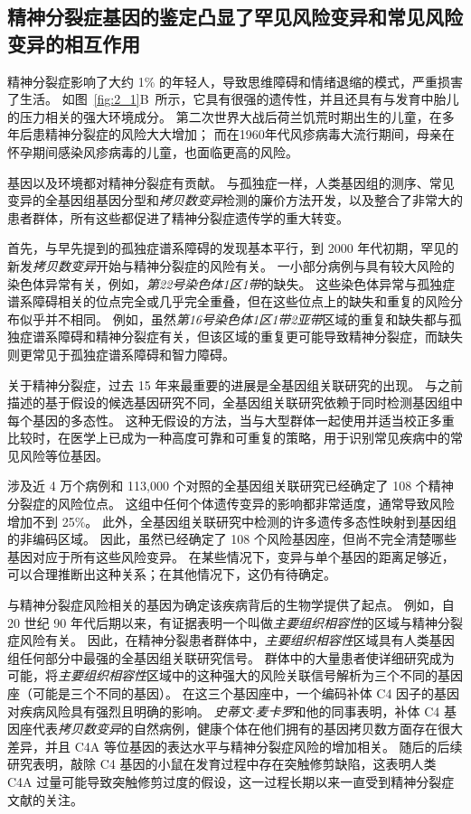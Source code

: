 \subsection{精神分裂症基因的鉴定凸显了罕见风险变异和常见风险变异的相互作用}

精神分裂症影响了大约 1\% 的年轻人，导致思维障碍和情绪退缩的模式，严重损害了生活。
如图~\ref{fig:2_1}B~所示，它具有很强的遗传性，并且还具有与发育中胎儿的压力相关的强大环境成分。
第二次世界大战后荷兰饥荒时期出生的儿童，在多年后患精神分裂症的风险大大增加；
而在1960年代风疹病毒大流行期间，母亲在怀孕期间感染风疹病毒的儿童，也面临更高的风险。

基因以及环境都对精神分裂症有贡献。
与孤独症一样，人类基因组的测序、常见变异的全基因组基因分型和\textit{拷贝数变异}检测的廉价方法开发，以及整合了非常大的患者群体，所有这些都促进了精神分裂症遗传学的重大转变。

首先，与早先提到的孤独症谱系障碍的发现基本平行，到 2000 年代初期，罕见的新发\textit{拷贝数变异}开始与精神分裂症的风险有关。
一小部分病例与具有较大风险的染色体异常有关，例如，\textit{第22号染色体1区1带}的缺失。
这些染色体异常与孤独症谱系障碍相关的位点完全或几乎完全重叠，但在这些位点上的缺失和重复的风险分布似乎并不相同。
例如，虽然\textit{第16号染色体1区1带2亚带}区域的重复和缺失都与孤独症谱系障碍和精神分裂症有关，但该区域的重复更可能导致精神分裂症，而缺失则更常见于孤独症谱系障碍和智力障碍。


关于精神分裂症，过去 15 年来最重要的进展是全基因组关联研究的出现。
与之前描述的基于假设的候选基因研究不同，全基因组关联研究依赖于同时检测基因组中每个基因的多态性。
这种无假设的方法，当与大型群体一起使用并适当校正多重比较时，在医学上已成为一种高度可靠和可重复的策略，用于识别常见疾病中的常见风险等位基因。


涉及近 4 万个病例和 113,000 个对照的全基因组关联研究已经确定了 108 个精神分裂症的风险位点。 
这组中任何个体遗传变异的影响都非常适度，通常导致风险增加不到 25\%。
此外，全基因组关联研究中检测的许多遗传多态性映射到基因组的非编码区域。
因此，虽然已经确定了 108 个风险基因座，但尚不完全清楚哪些基因对应于所有这些风险变异。
在某些情况下，变异与单个基因的距离足够近，可以合理推断出这种关系；在其他情况下，这仍有待确定。


与精神分裂症风险相关的基因为确定该疾病背后的生物学提供了起点。
例如，自 20 世纪 90 年代后期以来，有证据表明一个叫做\textit{主要组织相容性}的区域与精神分裂症风险有关。
因此，在精神分裂患者群体中，\textit{主要组织相容性}区域具有人类基因组任何部分中最强的全基因组关联研究信号。
群体中的大量患者使详细研究成为可能，将\textit{主要组织相容性}区域中的这种强大的风险关联信号解析为三个不同的基因座（可能是三个不同的基因）。
在这三个基因座中，一个编码补体 C4 因子的基因对疾病风险具有强烈且明确的影响。
\textit{史蒂文$\cdot$麦卡罗}和他的同事表明，补体 C4 基因座代表\textit{拷贝数变异}的自然病例，健康个体在他们拥有的基因拷贝数方面存在很大差异，并且 C4A 等位基因的表达水平与精神分裂症风险的增加相关。
随后的后续研究表明，敲除 C4 基因的小鼠在发育过程中存在突触修剪缺陷，这表明人类 C4A 过量可能导致突触修剪过度的假设，这一过程长期以来一直受到精神分裂症文献的关注。

